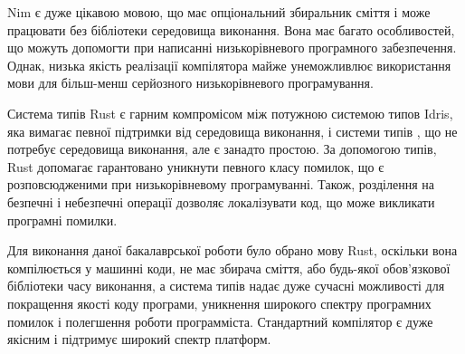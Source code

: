 \documentclass[oneside,14pt,a4paper,final]{myextreport}
\begin{document}
Nim є дуже цікавою мовою, що має опціональний збиральник сміття і може працювати без бібліотеки середовища виконання. Вона має багато особливостей, що можуть допомогти при написанні низькорівневого програмного забезпечення. Однак, низька якість реалізації компілятора майже унеможливлює використання мови для більш-менш серйозного низькорівневого програмування.

Система типів Rust є гарним компромісом між потужною системою типов Idris, яка вимагає певної підтримки від середовища виконання, і системи типів \LangC{}, що не потребує середовища виконання, але є занадто простою. За допомогою типів, Rust допомагає гарантовано уникнути певного класу помилок, що є розповсюдженими при низькорівневому програмуванні. Також, розділення на безпечні і небезпечні операції дозволяє локалізувати код, що може викликати програмні помилки.

Для виконання даної бакалаврської роботи було обрано мову Rust, оскільки вона компілюється у машинні коди, не має збирача сміття, або будь-якої обов'язкової бібліотеки часу виконання, а система типів надає дуже сучасні можливості для покращення якості коду програми, уникнення широкого спектру програмних помилок і полегшення роботи программіста. Стандартний компілятор є дуже якісним і підтримує широкий спектр платформ.
\end{document}
